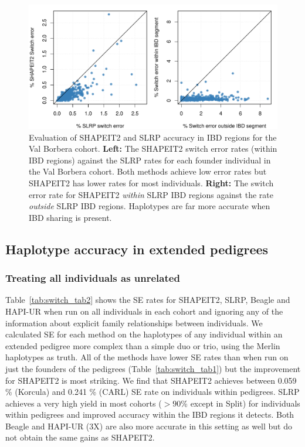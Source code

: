 \newpage
\begin{figure}[h]
  \begin{center} 
   \includegraphics[width=\textwidth]{chap4figs/vb_switcherror}%
  \end{center} 
  \caption[SHAPEIT2 and SLRP accuracy in IBD regions]{Evaluation of SHAPEIT2 and SLRP accuracy in IBD regions for the Val Borbera cohort. \textbf{Left:} The SHAPEIT2 switch error rates (within IBD regions) against the SLRP rates for each founder individual in the Val Borbera cohort.  Both methods achieve low error rates but SHAPEIT2 has lower rates for most individuals. \textbf{Right:} The switch error rate for SHAPEIT2 \emph{within}  SLRP IBD regions against the rate \emph{outside} SLRP IBD regions.  Haplotypes are far more accurate when IBD sharing is present.\label{fig:vb_ibd_switch}}
\end{figure}

\subsection{Haplotype accuracy in extended pedigrees}

\subsubsection{Treating all individuals as unrelated}

Table~\ref{tab:switch_tab2} shows the SE rates for SHAPEIT2, SLRP, Beagle and HAPI-UR when run on all individuals in each cohort and ignoring any of the information about explicit family relationships between individuals. We calculated SE for each method on the haplotypes of any individual within an extended pedigree more complex than a simple duo or trio, using the Merlin haplotypes as truth. All of the methods have lower SE rates than when run on just the founders of the pedigrees (Table~\ref{tab:switch_tab1}) but the improvement for SHAPEIT2 is most striking. We find that SHAPEIT2 achieves between 0.059 \% (Korcula) and 0.241 \% (CARL) SE rate on individuals within pedigrees.  SLRP achieves a very high yield in most cohorts ($>90$\% except in Split)  for individuals within pedigrees and improved accuracy within the IBD regions it detects.  Both Beagle and HAPI-UR (3X) are also more accurate in this setting as well but do not obtain the same gains as SHAPEIT2. 


